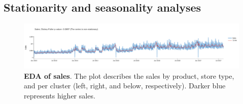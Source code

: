 \subsection[Stationarity and seasonality analyses]{Stationarity and seasonality analyses}
\label{sec:st_s_analysis}

\begin{figure}[!htb]
  \centering
  \includegraphics[width=1\textwidth]{plots/eda/target-time-series-plot-DF-test.png}
  \caption[EDA of sales]{\textbf{EDA of sales}. The plot describes the sales by product, store type, and per cluster (left, right, and below, respectively). Darker blue represents higher sales. }
  \label{fig:eda}
\end{figure}

